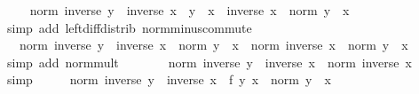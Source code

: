\begin{isabellebody}
\ \isamarkupfalse%
\ {\isachardoublequoteopen}{\isachardot}{\kern0pt}{\isachardot}{\kern0pt}{\isachardot}{\kern0pt}\ {\isacharequal}{\kern0pt}\ norm\ {\isacharparenleft}{\kern0pt}{\isacharparenleft}{\kern0pt}inverse\ y\ {\isacharminus}{\kern0pt}\ inverse\ x{\isacharparenright}{\kern0pt}\ {\isacharasterisk}{\kern0pt}\ {\isacharparenleft}{\kern0pt}y\ {\isacharminus}{\kern0pt}\ x{\isacharparenright}{\kern0pt}\ {\isacharasterisk}{\kern0pt}\ inverse\ x{\isacharparenright}{\kern0pt}\ {\isacharslash}{\kern0pt}\ norm\ {\isacharparenleft}{\kern0pt}y\ {\isacharminus}{\kern0pt}\ x{\isacharparenright}{\kern0pt}{\isachardoublequoteclose}\isanewline
\ \ \ \ \isamarkupfalse%
\ {\isacharparenleft}{\kern0pt}simp\ add{\isacharcolon}{\kern0pt}\ left{\isacharunderscore}{\kern0pt}diff{\isacharunderscore}{\kern0pt}distrib\ norm{\isacharunderscore}{\kern0pt}minus{\isacharunderscore}{\kern0pt}commute{\isacharparenright}{\kern0pt}\isanewline
\ \ \isamarkupfalse%
\ \isamarkupfalse%
\ {\isachardoublequoteopen}{\isasymdots}\ {\isasymle}\ norm\ {\isacharparenleft}{\kern0pt}inverse\ y\ {\isacharminus}{\kern0pt}\ inverse\ x{\isacharparenright}{\kern0pt}\ {\isacharasterisk}{\kern0pt}\ norm\ {\isacharparenleft}{\kern0pt}y\ {\isacharminus}{\kern0pt}\ x{\isacharparenright}{\kern0pt}\ {\isacharasterisk}{\kern0pt}\ norm\ {\isacharparenleft}{\kern0pt}inverse\ x{\isacharparenright}{\kern0pt}\ {\isacharslash}{\kern0pt}\ norm\ {\isacharparenleft}{\kern0pt}y\ {\isacharminus}{\kern0pt}\ x{\isacharparenright}{\kern0pt}{\isachardoublequoteclose}\isanewline
\ \ \ \ \isamarkupfalse%
\ {\isacharparenleft}{\kern0pt}simp\ add{\isacharcolon}{\kern0pt}\ norm{\isacharunderscore}{\kern0pt}mult{\isacharparenright}{\kern0pt}\isanewline
\ \ \isamarkupfalse%
\ \isamarkupfalse%
\ {\isachardoublequoteopen}{\isasymdots}\ {\isacharequal}{\kern0pt}\ norm\ {\isacharparenleft}{\kern0pt}inverse\ y\ {\isacharminus}{\kern0pt}\ inverse\ x{\isacharparenright}{\kern0pt}\ {\isacharasterisk}{\kern0pt}\ norm\ {\isacharparenleft}{\kern0pt}inverse\ x{\isacharparenright}{\kern0pt}{\isachardoublequoteclose}\isanewline
\ \ \ \ \isamarkupfalse%
\ simp\isanewline
\ \ \isamarkupfalse%
\ \isamarkupfalse%
\ {\isachardoublequoteopen}norm\ {\isacharparenleft}{\kern0pt}inverse\ y\ {\isacharminus}{\kern0pt}\ inverse\ x\ {\isacharminus}{\kern0pt}\ {\isacharquery}{\kern0pt}f\ {\isacharparenleft}{\kern0pt}y\ {\isacharminus}{\kern0pt}x{\isacharparenright}{\kern0pt}{\isacharparenright}{\kern0pt}\ {\isacharslash}{\kern0pt}\ norm\ {\isacharparenleft}{\kern0pt}y\ {\isacharminus}{\kern0pt}\ x{\isacharparenright}{\kern0pt}\ {\isasymle}\isanewline

\end{isabellebody}
